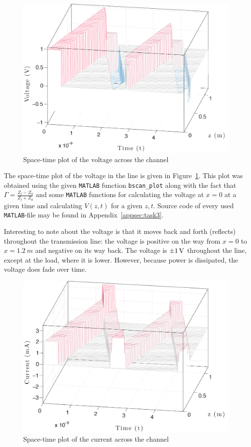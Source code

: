 \documentclass[11pt,titlepage]{report}
\begin{document}
\begin{figure}[H]
	\centering
	\includegraphics[width=.85\linewidth]{resource/voltage-cropped.pdf}
	\caption{Space-time plot of the voltage across the channel}
	\label{fig:ass1-voltage}
\end{figure}

The space-time plot of the voltage in the line is given in Figure~\ref{fig:ass1-voltage}. This plot was obtained using the given \texttt{MATLAB} function \texttt{bscan\_plot} along with the fact that $\Gamma=\frac{Z_l-Z_0}{Z_l+Z_0}$ and some \texttt{MATLAB} functions for calculating the voltage at $x=0$ at a given time and calculating $V(z,t)$ for a given $z,t$. Source code of every used \texttt{MATLAB}-file may be found in Appendix~\ref{appsec:task3}.

Interesting to note about the voltage is that it moves back and forth (reflects) throughout the transmission line: the voltage is positive on the way from $x=0$ to $x=\SI{1.2}{m}$ and negative on its way back. The voltage is $\SI{\pm1}{V}$ throughout the line, except at the load, where it is lower. However, because power is dissipated, the voltage does fade over time.

\begin{figure}[H]
	\centering
	\includegraphics[width=.85\linewidth]{resource/current-cropped.pdf}
	\caption{Space-time plot of the current across the channel}
	\label{fig:ass1-current}
\end{figure}
\end{document}
